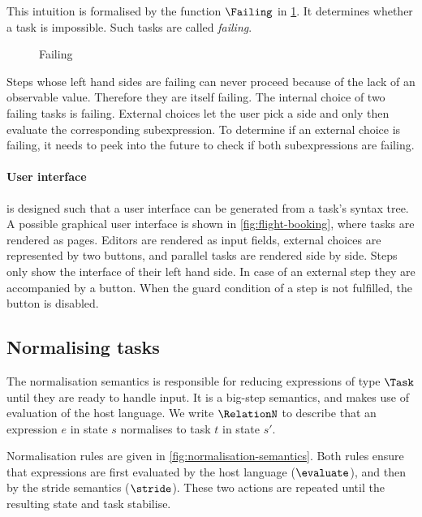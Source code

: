 This intuition is formalised by the function $\Failing$ in \cref{fig:observation-failing}.
It determines whether a task is impossible.
Such tasks are called \emph{failing}.

\begin{figure}[h]
  \small
  \caption{Failing} \label{fig:observation-failing}
\end{figure}

Steps whose left hand sides are failing can never proceed because of the lack of an observable value.
Therefore they are itself failing.
The internal choice of two failing tasks is failing.
External choices let the user pick a side and only then evaluate the corresponding subexpression.
To determine if an external choice is failing, it needs to peek into the future to check if both subexpressions are failing.



\paragraph{User interface}

\TOPHAT is designed such that a user interface can be generated from a task's syntax tree.
A possible graphical user interface is shown in \cref{fig:flight-booking}, where tasks are rendered as \HTML pages.
Editors are rendered as input fields,
external choices are represented by two buttons,
and parallel tasks are rendered side by side.
Steps only show the interface of their left hand side.
In case of an external step they are accompanied by a button.
When the guard condition of a step is not fulfilled, the button is disabled.



\subsection{Normalising tasks}
\label{sec:normalise}

The normalisation semantics is responsible for reducing expressions of type $\Task$ until they are ready to handle input.
It is a big-step semantics, and makes use of evaluation of the host language.
We write $\RelationN$ to describe that
an expression $e$ in state $s$ normalises to task $t$ in state $s'$.

Normalisation rules are given in \cref{fig:normalisation-semantics}.
Both rules ensure that expressions are first evaluated by the host language ($\evaluate$), and then by the stride semantics ($\stride$).
These two actions are repeated until the resulting state and task stabilise.

